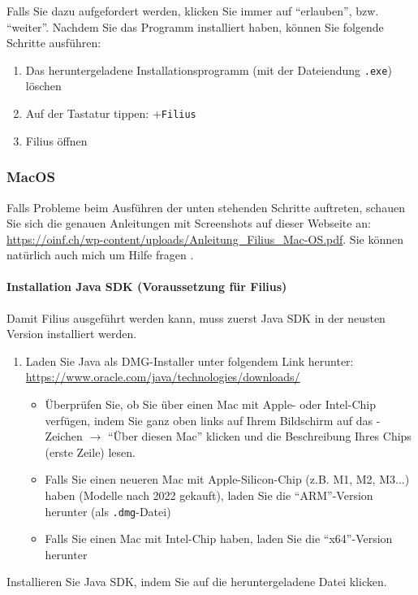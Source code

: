 Falls Sie dazu aufgefordert werden, klicken Sie immer auf ``erlauben'', bzw. ``weiter''. Nachdem Sie das Programm installiert haben, können Sie folgende Schritte ausführen:
\begin{enumerate}
	\item Das heruntergeladene Installationsprogramm (mit der Dateiendung \texttt{.exe}) löschen
	\item Auf der Tastatur tippen: \faWindows+\texttt{Filius}
	\item Filius öffnen
\end{enumerate}
\subsubsection{MacOS}
\begin{mycaution}
	Falls Probleme beim Ausführen der unten stehenden Schritte auftreten, schauen Sie sich die genauen Anleitungen mit Screenshots auf dieser Webseite an: \url{https://oinf.ch/wp-content/uploads/Anleitung_Filius_Mac-OS.pdf}. Sie können natürlich auch mich um Hilfe fragen .
\end{mycaution}
\paragraph*{Installation Java SDK (Voraussetzung für Filius)}
Damit Filius ausgeführt werden kann, muss zuerst Java SDK in der neusten Version installiert werden.
\begin{enumerate}
	\item Laden Sie Java als DMG-Installer unter folgendem Link herunter: \url{https://www.oracle.com/java/technologies/downloads/}
	      \begin{itemize}
		      \item Überprüfen Sie, ob Sie über einen Mac mit Apple- oder Intel-Chip verfügen, indem Sie ganz oben links auf Ihrem Bildschirm auf das \faApple{}-Zeichen $\rightarrow$ ``Über diesen Mac'' klicken und die Beschreibung Ihres Chips (erste Zeile) lesen.
		      \item Falls Sie einen neueren Mac mit Apple-Silicon-Chip (z.B. M1, M2, M3...) haben (Modelle nach 2022 gekauft), laden Sie die ``ARM''-Version herunter (als \texttt{.dmg}-Datei)
		      \item Falls Sie einen Mac mit Intel-Chip haben, laden Sie die ``x64''-Version herunter
	      \end{itemize}
\end{enumerate}

Installieren Sie Java SDK, indem Sie auf die heruntergeladene Datei klicken.

